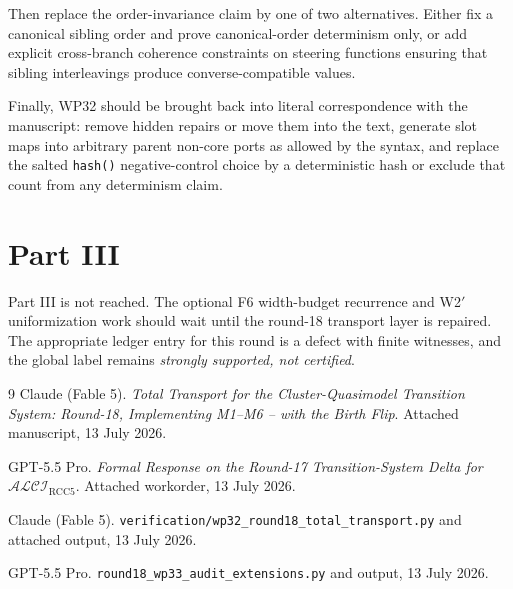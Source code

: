 \documentclass[11pt]{article}
\newcommand{\ALCIRCC}{\mathcal{ALCI}_{\mathrm{RCC5}}}
\newcommand{\code}[1]{\texttt{#1}}
\theoremstyle{remark}
\begin{document}
Then replace the order-invariance claim by one of two alternatives.  Either fix a canonical sibling order and prove canonical-order determinism only, or add explicit cross-branch coherence constraints on steering functions ensuring that sibling interleavings produce converse-compatible values.

Finally, WP32 should be brought back into literal correspondence with the manuscript: remove hidden repairs or move them into the text, generate slot maps into arbitrary parent non-core ports as allowed by the syntax, and replace the salted \code{hash()} negative-control choice by a deterministic hash or exclude that count from any determinism claim.

\section{Part III}

Part III is not reached.  The optional F6 width-budget recurrence and W2$'$ uniformization work should wait until the round-18 transport layer is repaired.  The appropriate ledger entry for this round is a defect with finite witnesses, and the global label remains \emph{strongly supported, not certified}.

\begin{thebibliography}{9}
Claude (Fable 5).  \emph{Total Transport for the Cluster-Quasimodel Transition System: Round-18, Implementing M1--M6 -- with the Birth Flip}.  Attached manuscript, 13 July 2026.

GPT-5.5 Pro.  \emph{Formal Response on the Round-17 Transition-System Delta for $\ALCIRCC$}.  Attached workorder, 13 July 2026.

Claude (Fable 5).  \code{verification/wp32\_round18\_total\_transport.py} and attached output, 13 July 2026.

GPT-5.5 Pro.  \code{round18\_wp33\_audit\_extensions.py} and output, 13 July 2026.
\end{thebibliography}
\end{document}
